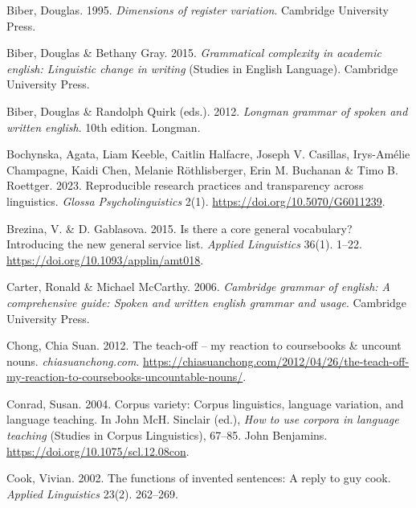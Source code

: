 \documentclass[
  letterpaper,
  DIV=11,
  numbers=noendperiod]{scrreprt}
\newlength{\cslhangindent}
\newenvironment{CSLReferences}[2] %
 {\begin{list}{}{%
  \setlength{\itemindent}{0pt}
  \setlength{\leftmargin}{0pt}
  \setlength{\parsep}{0pt}
  \ifodd #1
   \setlength{\leftmargin}{\cslhangindent}
   \setlength{\itemindent}{-1\cslhangindent}
  \fi
  \setlength{\itemsep}{#2\baselineskip}}}
 {\end{list}}
\begin{document}
\begin{CSLReferences}{1}{0}
Biber, Douglas. 1995. \emph{Dimensions of register variation}. Cambridge
University Press.

Biber, Douglas \& Bethany Gray. 2015. \emph{Grammatical complexity in
academic english: Linguistic change in writing} (Studies in English
Language). Cambridge University Press.

Biber, Douglas \& Randolph Quirk (eds.). 2012. \emph{Longman grammar of
spoken and written english}. 10th edition. Longman.

Bochynska, Agata, Liam Keeble, Caitlin Halfacre, Joseph V. Casillas,
Irys-Amélie Champagne, Kaidi Chen, Melanie Röthlisberger, Erin M.
Buchanan \& Timo B. Roettger. 2023. Reproducible research practices and
transparency across linguistics. \emph{Glossa Psycholinguistics} 2(1).
\url{https://doi.org/10.5070/G6011239}.

Brezina, V. \& D. Gablasova. 2015. Is there a core general vocabulary?
Introducing the new general service list. \emph{Applied Linguistics}
36(1). 1--22. \url{https://doi.org/10.1093/applin/amt018}.

Carter, Ronald \& Michael McCarthy. 2006. \emph{Cambridge grammar of
english: A comprehensive guide: Spoken and written english grammar and
usage}. Cambridge University Press.

Chong, Chia Suan. 2012. The teach-off -- my reaction to coursebooks \&
uncount nouns. \emph{chiasuanchong.com}.
\url{https://chiasuanchong.com/2012/04/26/the-teach-off-my-reaction-to-coursebooks-uncountable-nouns/}.

Conrad, Susan. 2004. Corpus variety: Corpus linguistics, language
variation, and language teaching. In John McH. Sinclair (ed.), \emph{How
to use corpora in language teaching} (Studies in Corpus Linguistics),
67--85. John Benjamins. \url{https://doi.org/10.1075/scl.12.08con}.

Cook, Vivian. 2002. The functions of invented sentences: A reply to guy
cook. \emph{Applied Linguistics} 23(2). 262--269.


\end{CSLReferences}
\end{document}
